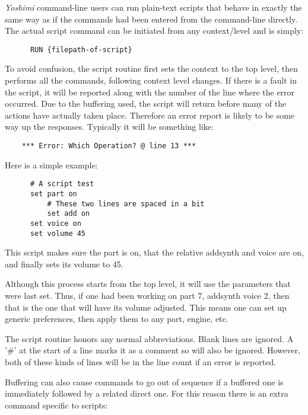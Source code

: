    \textsl{Yoshimi} command-line users can run plain-text scripts that behave
   in exactly the same way as if the commands had been entered from the
   command-line directly.
   The actual script command can be initiated from any context/level
   and is simply:

   \begin{verbatim}
      RUN {filepath-of-script}
   \end{verbatim}

   To avoid confusion, the script routine first sets the context to the
   top level, then performs all the commands, following context level changes.
   If there is a fault in the script, it will be reported along with the
   number of the line where the error occurred. Due to the buffering used, the
   script will return before many of the actions have actually taken place.
   Therefore an error report is likely to be some way up the responses.
   Typically it will be something like:

   \begin{verbatim}
    *** Error: Which Operation? @ line 13 ***
   \end{verbatim}

   Here is a simple example:

   \begin{verbatim}
      # A script test
      set part on
          # These two lines are spaced in a bit
          set add on
      set voice on
      set volume 45
   \end{verbatim}

   This script makes sure the part is on, that the relative addsynth and voice
   are on, and finally sets its volume to 45.

   Although this process starts from the top level, it will use the parameters
   that were last set.
   Thus, if one had been working on part 7, addsynth voice 2,
   then that is the one that will have its volume adjusted.
   This means one can set up generic preferences,
   then apply them to any part, engine, etc.

   The script routine honors any normal abbreviations.
   Blank lines are ignored. A '\#' at the start of a line marks it
   as a comment so will also be ignored. However, both of these kinds
   of lines will be in the line count if an error is reported.

   Buffering can also cause commands to go out of sequence if a buffered one is
   immediately followed by a related direct one. For this reason there is an
   extra command specific to scripts:

